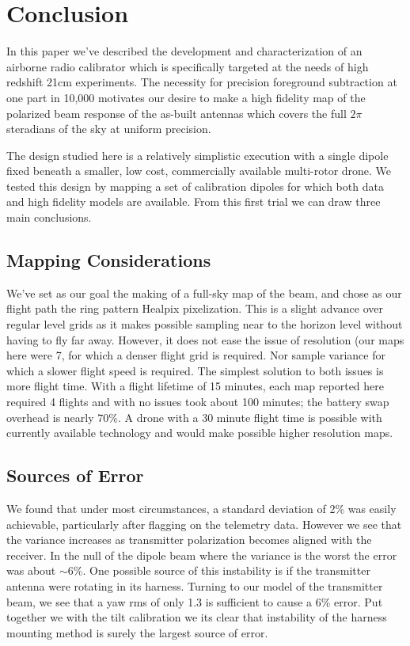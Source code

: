 \documentclass[preprint2,numberedappendix,tighten,twocolappendix]{aastex6}
\begin{document}
\section{Conclusion}
\label{sec:conclusion}
In this paper we've described the development and characterization of an airborne radio calibrator which is specifically targeted at the needs of high redshift 21cm experiments. The necessity for precision foreground subtraction at one part in 10,000 motivates our desire to make a high fidelity map of the polarized beam response of the as-built antennas which covers the full $2\pi$ steradians of the sky at uniform precision. 

The design studied here is a relatively simplistic execution with a single dipole fixed beneath a smaller, low cost, commercially available multi-rotor drone.  We tested this design by mapping a set of calibration dipoles for which both data and high fidelity models are available.   From this first trial we can draw three main conclusions.

\subsection{Mapping Considerations}
We've set as our goal the making of a full-sky map of the beam, and chose as our flight path the ring pattern Healpix pixelization. This is a slight advance over regular level grids as it makes possible sampling near to the horizon level without having to fly far away. However, it does not ease the issue of resolution (our maps here were 7\arcdeg{}, for which a denser flight grid is required. Nor sample variance for which a slower flight speed is required. The simplest solution to both issues is more flight time. With a flight lifetime of 15 minutes, each map reported here required 4 flights and with no issues took about 100 minutes; the battery swap overhead is nearly 70\%.  A drone with a 30 minute flight time is possible with currently available technology and would make possible higher resolution maps.

\subsection{Sources of Error}
We found that under most circumstances, a standard deviation of 2\% was easily achievable, particularly after flagging on the telemetry data. However we see that the variance increases as transmitter polarization becomes aligned with the receiver. In the null of the dipole beam where the variance is the worst the error was about $\sim$6\%. One possible source of this instability is if the transmitter antenna were rotating in its harness. Turning to our model of the transmitter beam, we see that a yaw rms of only 1.3\arcdeg{} is sufficient to cause a 6\% error. Put together we with the tilt calibration we its clear that instability of the harness mounting method is surely the largest source of error. 
\end{document}
